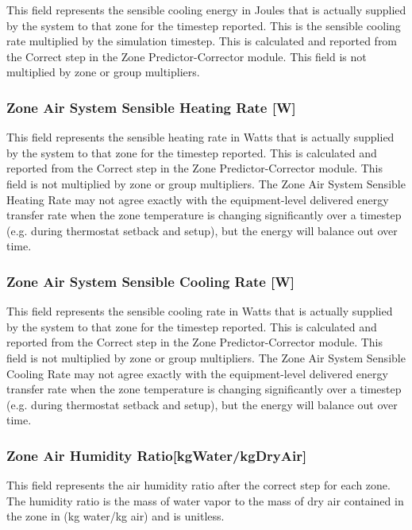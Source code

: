 This field represents the sensible cooling energy in Joules that is actually supplied by the system to that zone for the timestep reported. This is the sensible cooling rate multiplied by the simulation timestep. This is calculated and reported from the Correct step in the Zone Predictor-Corrector module. This field is not multiplied by zone or group multipliers.

\subsubsection{Zone Air System Sensible Heating Rate {[}W{]}}\label{zone-air-system-sensible-heating-rate-w-1}

This field represents the sensible heating rate in Watts that is actually supplied by the system to that zone for the timestep reported. This is calculated and reported from the Correct step in the Zone Predictor-Corrector module. This field is not multiplied by zone or group multipliers. The Zone Air System Sensible Heating Rate may not agree exactly with the equipment-level delivered energy transfer rate when the zone temperature is changing significantly over a timestep (e.g. during thermostat setback and setup), but the energy will balance out over time.

\subsubsection{Zone Air System Sensible Cooling Rate {[}W{]}}\label{zone-air-system-sensible-cooling-rate-w-1}

This field represents the sensible cooling rate in Watts that is actually supplied by the system to that zone for the timestep reported. This is calculated and reported from the Correct step in the Zone Predictor-Corrector module. This field is not multiplied by zone or group multipliers. The Zone Air System Sensible Cooling Rate may not agree exactly with the equipment-level delivered energy transfer rate when the zone temperature is changing significantly over a timestep (e.g. during thermostat setback and setup), but the energy will balance out over time.

\subsubsection{Zone Air Humidity Ratio{[}kgWater/kgDryAir{]}}\label{zone-air-humidity-ratiokgwaterkgdryair}

This field represents the air humidity ratio after the correct step for each zone. The humidity ratio is the mass of water vapor to the mass of dry air contained in the zone in (kg water/kg air) and is unitless.

